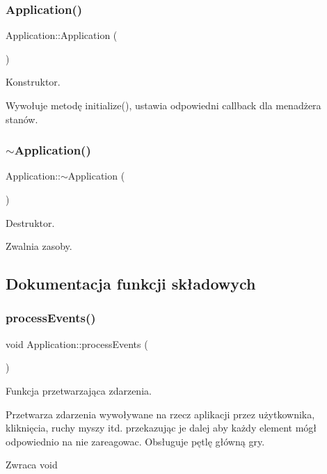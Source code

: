 \subsubsection{Application()}
{\footnotesize\ttfamily Application\+::\+Application (\begin{DoxyParamCaption}{ }\end{DoxyParamCaption})}



Konstruktor. 

Wywołuje metodę initialize(), ustawia odpowiedni callback dla menadżera stanów. \mbox{\label{class_application_a748bca84fefb9c12661cfaa2f623748d}} 
\subsubsection{$\sim$Application()}
{\footnotesize\ttfamily Application\+::$\sim$\+Application (\begin{DoxyParamCaption}{ }\end{DoxyParamCaption})}



Destruktor. 

Zwalnia zasoby. 

\subsection{Dokumentacja funkcji składowych}
\mbox{\label{class_application_a9ef46508e8c490439c67d8fb2321ced2}} 
\subsubsection{processEvents()}
{\footnotesize\ttfamily void Application\+::process\+Events (\begin{DoxyParamCaption}{ }\end{DoxyParamCaption})}



Funkcja przetwarzająca zdarzenia. 

Przetwarza zdarzenia wywoływane na rzecz aplikacji przez użytkownika, kliknięcia, ruchy myszy itd. przekazując je dalej aby każdy element mógł odpowiednio na nie zareagowac. Obsługuje pętlę główną gry. \begin{DoxyReturn}{Zwraca}
void 
\end{DoxyReturn}
\mbox{\label{class_application_a9ac99d97ee1cc814298a2f2388bde835}} 
